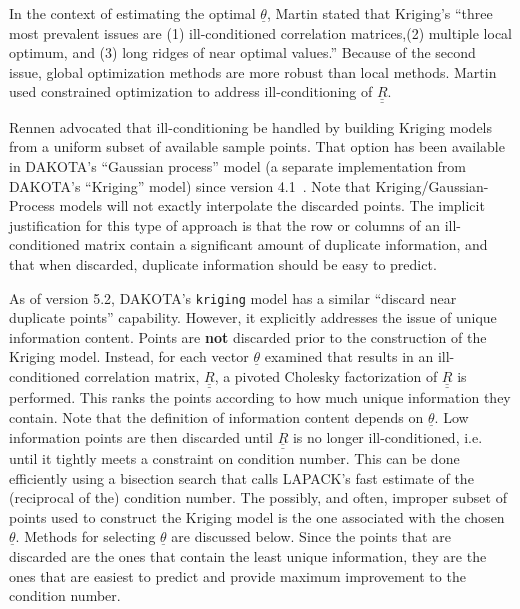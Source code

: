 In the context of estimating the optimal $\underline{\theta}$,
Martin \cite{Mar09} stated that Kriging's
``three most prevalent issues are (1) ill-conditioned correlation 
matrices,(2) multiple local optimum, and (3) long ridges of near 
optimal values.'' Because of the second issue, global optimization 
methods are more robust than local methods.  Martin used constrained 
optimization to address ill-conditioning of $\underline{\underline{R}}$.
\newline

Rennen \cite{Ren09} advocated that ill-conditioning
be handled by building Kriging models from a uniform subset of 
available sample points.  That option has been available in
DAKOTA's ``Gaussian process'' model (a separate implementation 
from DAKOTA's ``Kriging'' model) since version 4.1~\cite{UserMan4_1}. 
Note that Kriging/Gaussian-Process models 
will not exactly interpolate the discarded points.  The implicit 
justification for this type of approach is that the row or columns of 
an ill-conditioned matrix contain a significant amount of duplicate 
information, and that when discarded, duplicate information should be 
easy to predict.\newline  

As of version 5.2, DAKOTA's \texttt{kriging} model has a similar 
``discard near duplicate points'' capability.  However, it explicitly
addresses the issue of unique information content.  Points are {\bf not} 
discarded prior to the construction of the Kriging model.  Instead,
for each vector $\underline{\theta}$ examined that results in an 
ill-conditioned correlation matrix, $\underline{\underline{R}}$,
a pivoted Cholesky factorization of $\underline{\underline{R}}$ is 
performed.  This ranks the points according to how much unique 
information they contain.  Note that the definition of information
content depends on $\underline{\theta}$.  Low information points are 
then discarded until $\underline{\underline{R}}$ is no longer 
ill-conditioned, i.e. until it tightly meets a constraint on 
condition number.  This can be done efficiently using a bisection 
search that calls LAPACK's fast estimate of the (reciprocal of the) 
condition number.  The possibly, and often, improper subset of points 
used to construct the Kriging model is the one associated with the 
chosen $\underline{\theta}$.  Methods for selecting $\underline{\theta}$ 
are discussed below.  Since the points that are discarded are the ones 
that contain the least unique information, they are the ones that are 
easiest to predict and provide maximum improvement to the condition number.
\newline

